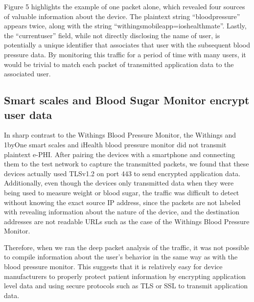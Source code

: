 Figure 5 highlights the example of one packet alone, which revealed four sources of valuable information about the device. The plaintext string ``blood\textunderscore pressure'' appears twice, along with the string ``withings\textunderscore mobile\textunderscore app=ios\textunderscore healthmate''. Lastly, the ``current\textunderscore user'' field, while not directly disclosing the name of user, is potentially a unique identifier that associates that user with the subsequent blood pressure data. By monitoring this traffic for a period of time with many users, it would be trivial to match each packet of transmitted application data to the associated user. 

\subsection{Smart scales and Blood Sugar Monitor encrypt user data}
In sharp contrast to the Withings Blood Pressure Monitor, the Withings and 1byOne smart scales and iHealth blood pressure monitor did not transmit plaintext e-PHI. After pairing the devices with a smartphone and connecting them to the test network to capture the transmitted packets, we found that these devices actually used TLSv1.2 on port 443 to send encrypted application data. Additionally, even though the devices only transmitted data when they were being used to measure weight or blood sugar, the traffic was difficult to detect without knowing the exact source IP address, since the packets are not labeled with revealing information about the nature of the device, and the destination addresses are not readable URLs such as the case of the Withings Blood Pressure Monitor. 

Therefore, when we ran the deep packet analysis of the traffic, it was not possible to compile information about the user's behavior in the same way as with the blood pressure monitor. This suggests that it is relatively easy for device manufacturers to properly protect patient information by encrypting application level data and using secure protocols such as TLS or SSL to transmit application data.




